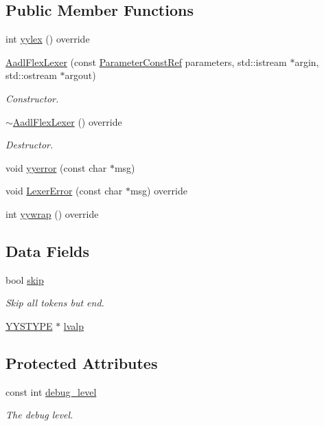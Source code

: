 \subsection*{Public Member Functions}
\begin{DoxyCompactItemize}
\item 
int \hyperlink{classAadlFlexLexer_a638b036ebe4596eada553be719ed0525}{yylex} () override
\item 
\hyperlink{classAadlFlexLexer_a909bb306df8052ac9217495e90803113}{Aadl\+Flex\+Lexer} (const \hyperlink{Parameter_8hpp_a37841774a6fcb479b597fdf8955eb4ea}{Parameter\+Const\+Ref} parameters, std\+::istream $\ast$argin, std\+::ostream $\ast$argout)
\begin{DoxyCompactList}\small\item\em Constructor. \end{DoxyCompactList}\item 
\hyperlink{classAadlFlexLexer_a413c465b45c633c8713ea696b02dd763}{$\sim$\+Aadl\+Flex\+Lexer} () override
\begin{DoxyCompactList}\small\item\em Destructor. \end{DoxyCompactList}\item 
void \hyperlink{classAadlFlexLexer_aac830c1b7622ca34e05bef9ae0689b03}{yyerror} (const char $\ast$msg)
\item 
void \hyperlink{classAadlFlexLexer_a37f8f43877e15f23a9a6068deea9e3dc}{Lexer\+Error} (const char $\ast$msg) override
\item 
int \hyperlink{classAadlFlexLexer_aad5e18b201f066245445b520c54f570b}{yywrap} () override
\end{DoxyCompactItemize}
\subsection*{Data Fields}
\begin{DoxyCompactItemize}
\item 
bool \hyperlink{classAadlFlexLexer_aed96291a7753184f16037abfea6bf1ec}{skip}
\begin{DoxyCompactList}\small\item\em Skip all tokens but end. \end{DoxyCompactList}\item 
\hyperlink{asn__parser_8cpp_a2ceb5b985e149f18e018b142cfdd7264}{Y\+Y\+S\+T\+Y\+PE} $\ast$ \hyperlink{classAadlFlexLexer_abf8dd2daa7b628814ac164d13b15077f}{lvalp}
\end{DoxyCompactItemize}
\subsection*{Protected Attributes}
\begin{DoxyCompactItemize}
\item 
const int \hyperlink{classAadlFlexLexer_ac360f0662222ee76aed9cabbc138ca5f}{debug\+\_\+level}
\begin{DoxyCompactList}\small\item\em The debug level. \end{DoxyCompactList}\end{DoxyCompactItemize}


